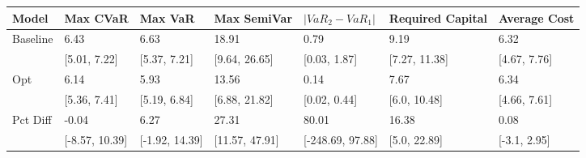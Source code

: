 \begin{tabular}{lllllll}
\toprule
   Model &       Max CVaR &        Max VaR &    Max SemiVar & $|VaR_2 - VaR_1|$ & Required Capital & Average Cost \\
\midrule
Baseline &           6.43 &           6.63 &          18.91 &              0.79 &             9.19 &         6.32 \\
         &   [5.01, 7.22] &   [5.37, 7.21] &  [9.64, 26.65] &      [0.03, 1.87] &    [7.27, 11.38] & [4.67, 7.76] \\
     Opt &           6.14 &           5.93 &          13.56 &              0.14 &             7.67 &         6.34 \\
         &   [5.36, 7.41] &   [5.19, 6.84] &  [6.88, 21.82] &      [0.02, 0.44] &     [6.0, 10.48] & [4.66, 7.61] \\
Pct Diff &          -0.04 &           6.27 &          27.31 &             80.01 &            16.38 &         0.08 \\
         & [-8.57, 10.39] & [-1.92, 14.39] & [11.57, 47.91] &  [-248.69, 97.88] &     [5.0, 22.89] & [-3.1, 2.95] \\
\bottomrule
\end{tabular}
